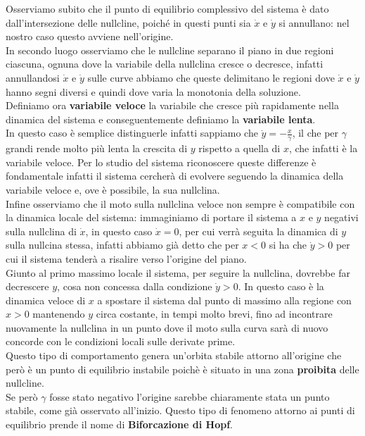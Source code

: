 Osserviamo subito che il punto di equilibrio complessivo del sistema è dato dall'intersezione delle nullcline, poiché in questi punti sia $\dot{x}$ e $\dot{y}$ si annullano: nel nostro caso questo avviene nell'origine.\\

In secondo luogo osserviamo che le nullcline separano il piano in due regioni ciascuna, ognuna dove la variabile della nullclina cresce o decresce, infatti annullandosi $\dot{x}$ e $\dot{y}$ sulle curve abbiamo che queste delimitano le regioni dove $\dot{x}$ e $\dot{y}$ hanno segni diversi e quindi dove varia la monotonia della soluzione.\\

Definiamo ora \textbf{variabile veloce} la variabile che cresce più rapidamente nella dinamica del sistema e conseguentemente definiamo la \textbf{variabile lenta}.\\ In questo caso è semplice distinguerle infatti sappiamo che $\dot{y}=-\frac{x}{\gamma}$, il che per $\gamma$ grandi rende molto più lenta la crescita di $y$ rispetto a quella di $x$, che infatti è la variabile veloce. Per lo studio del sistema riconoscere queste differenze è fondamentale infatti il sistema cercherà di evolvere seguendo la dinamica della variabile veloce e, ove è possibile, la sua nullclina. \\

Infine osserviamo che il moto sulla nullclina veloce non sempre è compatibile con la dinamica locale del sistema: immaginiamo di portare il sistema a $x$ e $y$ negativi sulla nullclina di $\dot{x}$, in questo caso $\dot{x}=0$, per cui verrà seguita la dinamica di $y$ sulla nullcina stessa, infatti abbiamo già detto che per $x<0$ si ha che $\dot{y}>0$ per cui il sistema tenderà a risalire verso l'origine del piano. \\
Giunto al primo massimo locale il sistema, per seguire la nullclina, dovrebbe far decrescere $y$, cosa non concessa dalla condizione $\dot{y}>0$. In questo caso è la dinamica veloce di $x$ a spostare il sistema dal punto di massimo alla regione con $x>0$ mantenendo $y$ circa costante, in tempi molto brevi, fino ad incontrare nuovamente la nullclina in un punto dove il moto sulla curva sarà di nuovo concorde con le condizioni locali sulle derivate prime.\\

Questo tipo di comportamento genera un'orbita stabile attorno all'origine che però è un punto di equilibrio instabile poichè è situato in una zona \textbf{proibita} delle nullcline.\\ Se però $\gamma$ fosse stato negativo l'origine sarebbe chiaramente stata un punto stabile, come già osservato all'inizio. Questo tipo di fenomeno attorno ai punti di equilibrio prende il nome di \textbf{Biforcazione di Hopf}. 

